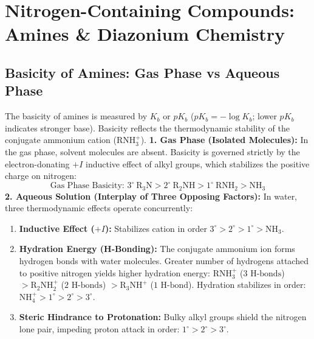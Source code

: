 \documentclass[10pt,a4paper]{article}
\begin{document}
\section{Nitrogen-Containing Compounds: Amines \& Diazonium Chemistry}

\subsection{Basicity of Amines: Gas Phase vs Aqueous Phase}

\begin{conceptbox}
The basicity of amines is measured by $K_b$ or $pK_b$ ($pK_b = -\log K_b$; lower $pK_b$ indicates stronger base). Basicity reflects the thermodynamic stability of the conjugate ammonium cation ($\mathrm{RNH_3^+}$).
\textbf{1. Gas Phase (Isolated Molecules):}
In the gas phase, solvent molecules are absent. Basicity is governed strictly by the electron-donating $+I$ inductive effect of alkyl groups, which stabilizes the positive charge on nitrogen:
\begin{equation}
  \text{Gas Phase Basicity: } 3^\circ \ \mathrm{R_3N} > 2^\circ \ \mathrm{R_2NH} > 1^\circ \ \mathrm{RNH_2} > \mathrm{NH_3}
\end{equation}
\textbf{2. Aqueous Solution (Interplay of Three Opposing Factors):}
In water, three thermodynamic effects operate concurrently:
\begin{enumerate}
  \item \textbf{Inductive Effect ($+I$):} Stabilizes cation in order $3^\circ > 2^\circ > 1^\circ > \mathrm{NH_3}$.
  \item \textbf{Hydration Energy (H-Bonding):} The conjugate ammonium ion forms hydrogen bonds with water molecules. Greater number of hydrogens attached to positive nitrogen yields higher hydration energy: $\mathrm{RNH_3^+}$ ($3\text{ H-bonds}$) $> \mathrm{R_2NH_2^+}$ ($2\text{ H-bonds}$) $> \mathrm{R_3NH^+}$ ($1\text{ H-bond}$). Hydration stabilizes in order: $\mathrm{NH_4^+} > 1^\circ > 2^\circ > 3^\circ$.
  \item \textbf{Steric Hindrance to Protonation:} Bulky alkyl groups shield the nitrogen lone pair, impeding proton attack in order: $1^\circ > 2^\circ > 3^\circ$.
\end{enumerate}
\end{conceptbox}
\end{document}
